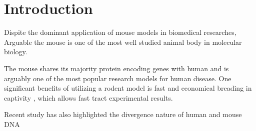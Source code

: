 \section{Introduction}

Dispite the dominant application of mouse models in biomedical researches, Arguable the mouse is one of the most well studied animal body in molecular biology. 

The mouse shares its majority protein encoding genes with human and is arguably one of the most popular research models for human disease. One significant benefits of utilizing a rodent model is fast and economical breading in captivity \cite{Rosenthal_2007}, which allows fast tract experimental results. \cite{Vandamme_2014} 

Recent study has also highlighted the divergence nature of human and mouse DNA 
